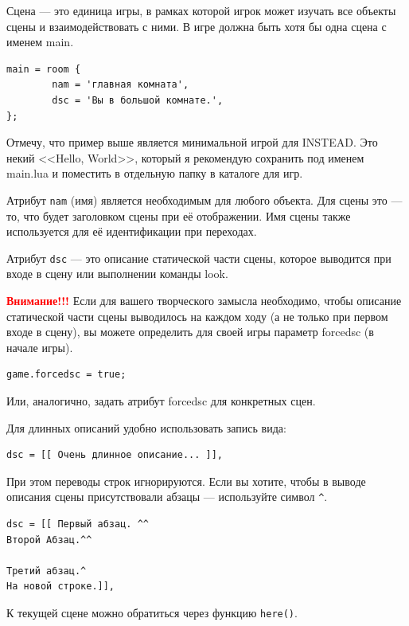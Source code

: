 \documentclass[a4paper,12pt]{article}
\begin{document}
Сцена --- это единица игры, в рамках которой игрок может изучать все объекты сцены и взаимодействовать с ними. В игре должна быть хотя бы одна сцена с именем main.

\begin{verbatim}
main = room {
        nam = 'главная комната',
        dsc = 'Вы в большой комнате.',
};
\end{verbatim}

Отмечу, что пример выше является минимальной игрой для INSTEAD. Это некий <<Hello, World>>, который я рекомендую сохранить под именем main.lua и поместить в отдельную папку в каталоге для игр.


Атрибут \verb/nam/ (имя) является необходимым для любого объекта. Для сцены это --- то, что будет заголовком сцены при её отображении. Имя сцены также используется для её идентификации при переходах.

Атрибут \verb/dsc/ --- это описание статической части сцены, которое выводится при входе в сцену или выполнении команды look.

\textbf{\textcolor{red}{Внимание!!!}} Если для вашего творческого замысла необходимо, чтобы описание статической части сцены выводилось на каждом ходу (а не только при первом входе в сцену), вы можете определить для своей игры параметр forcedsc (в начале игры).

\begin{verbatim}
game.forcedsc = true;
\end{verbatim}

Или, аналогично, задать атрибут forcedsc для конкретных сцен.

\index{[[ ]]}
Для длинных описаний удобно использовать запись вида:

\begin{verbatim}
dsc = [[ Очень длинное описание... ]],
\end{verbatim}

При этом переводы строк игнорируются. Если вы хотите, чтобы в выводе описания сцены присутствовали абзацы --- используйте символ \verb/^/.

\begin{verbatim}
dsc = [[ Первый абзац. ^^
Второй Абзац.^^

Третий абзац.^
На новой строке.]],
\end{verbatim}

К текущей сцене можно обратиться через функцию \verb/here()/.
\end{document}
